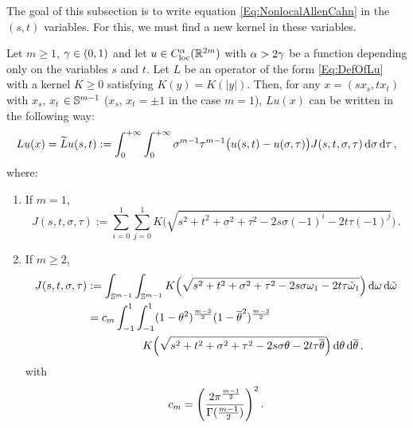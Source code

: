 The goal of this subsection is to write equation \eqref{Eq:NonlocalAllenCahn} in the $(s,t)$ variables. For this, we must find a new kernel in these variables.

\begin{lemma}
\label{Lemma:OperatorInSTVariables}
Let $m \geq 1$, $\gamma\in(0,1)$ and let $u\in C_{\mathrm{loc}}^\alpha(\mathbb{R}^{2m})$ with $\alpha > 2\gamma$ be a function depending only on the variables $s$ and $t$. Let $L$ be an operator of the form \eqref{Eq:DefOfLu} with a kernel $K\geq 0$ satisfying $K(y) = K(|y|)$. Then, for any $x = (s x_s, t x_t)$ with $x_s$, $x_t$ $\in \mathbb{S}^{m-1}$ ($x_s$, $x_t = \pm 1$ in the case $m=1$),  $Lu(x)$ can be written in the following way:
\begin{equation}
\label{Eq:OperatorInSTVariables}
Lu(x) = \widetilde{L} u (s,t) := \int_0^{+\infty}  \int_0^{+\infty} \sigma^{m-1} \tau^{m-1} \big(u(s,t) - u(\sigma, \tau)\big) J(s,t,\sigma, \tau)  \,\mathrm{d} \sigma\,\mathrm{d} \tau\,,
\end{equation}
where:
\begin{enumerate}
	\item If $m= 1$,
	\begin{equation}
		\label{Eq:KernelInSTVariablesR2}
	J(s,t,\sigma, \tau) := \sum_{i=0}^1  \sum_{j =0}^1  K\Big(\sqrt{s^2 + t^2 + \sigma^2 + \tau^2 -2 s \sigma (-1)^i -2 t \tau (-1)^j}\Big)\,.
	\end{equation}
	
	\item If $m\geq 2$,
	\begin{align}
	J(s,t,\sigma, \tau) &:= \int_{\mathbb{S}^{m-1}}  \int_{\mathbb{S}^{m-1}}  K\Big(\sqrt{s^2 + t^2 + \sigma^2 + \tau^2 -2 s \sigma \omega_1 -2 t \tau \tilde{\omega}_1}\Big) \,\mathrm{d} \omega \,\mathrm{d} \tilde{\omega}  \label{Eq:KernelSTVariables1}\\
	&= c_m \int_{-1}^1  \int_{-1}^1  (1-\theta^2)^{\frac{m-3}{2}} (1-\overline{\theta}^2)^{\frac{m-3}{2}} \nonumber\\
	& \quad \quad \quad \quad \quad 
	K\Big(\sqrt{s^2 + t^2 + \sigma^2 + \tau^2 -2 s \sigma \theta -2 t \tau \overline{\theta}}\Big) \,\mathrm{d} \theta \,\mathrm{d} \overline{\theta}\,, \label{Eq:KernelSTVariables2}
	\end{align}
	with 
	$$
	c_m = \left ( {\dfrac{2 \pi^{\frac{m-1}{2}}}{\Gamma (\frac{m-1}{2})}}\right )^2.
	$$
\end{enumerate}
\end{lemma}


